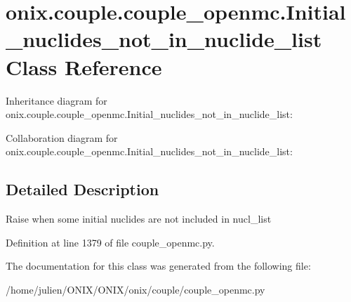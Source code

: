 \hypertarget{classonix_1_1couple_1_1couple__openmc_1_1Initial__nuclides__not__in__nuclide__list}{}\section{onix.\+couple.\+couple\+\_\+openmc.\+Initial\+\_\+nuclides\+\_\+not\+\_\+in\+\_\+nuclide\+\_\+list Class Reference}
\label{classonix_1_1couple_1_1couple__openmc_1_1Initial__nuclides__not__in__nuclide__list}


Inheritance diagram for onix.\+couple.\+couple\+\_\+openmc.\+Initial\+\_\+nuclides\+\_\+not\+\_\+in\+\_\+nuclide\+\_\+list\+:


Collaboration diagram for onix.\+couple.\+couple\+\_\+openmc.\+Initial\+\_\+nuclides\+\_\+not\+\_\+in\+\_\+nuclide\+\_\+list\+:


\subsection{Detailed Description}
\begin{DoxyVerb}Raise when some initial nuclides are not included in nucl_list \end{DoxyVerb}
 

Definition at line 1379 of file couple\+\_\+openmc.\+py.



The documentation for this class was generated from the following file\+:\begin{DoxyCompactItemize}
\item 
/home/julien/\+O\+N\+I\+X/\+O\+N\+I\+X/onix/couple/couple\+\_\+openmc.\+py\end{DoxyCompactItemize}
